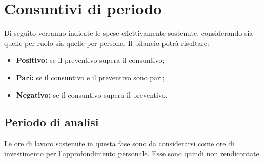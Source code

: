 \section{Consuntivi di periodo}
Di seguito verranno indicate le spese effettivamente sostenute, considerando sia quelle per ruolo sia quelle per persona. Il bilancio potrà risultare:
\begin{itemize}
	\item \textbf{Positivo:} se il preventivo supera il consuntivo;
	\item \textbf{Pari:} se il consuntivo e il preventivo sono pari;
	\item \textbf{Negativo:} se il consuntivo supera il preventivo.
\end{itemize}

\subsection{Periodo di analisi}
Le ore di lavoro sostenute in questa fase sono da considerarsi come ore di investimento per l'approfondimento personale. Esse sono quindi non rendicontate.

